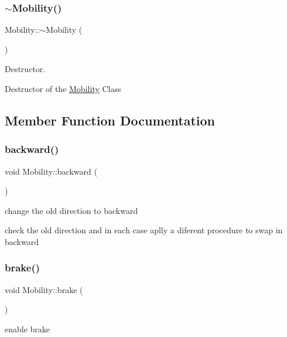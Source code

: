 \subsubsection{\texorpdfstring{$\sim$\+Mobility()}{~Mobility()}}
{\footnotesize\ttfamily Mobility\+::$\sim$\+Mobility (\begin{DoxyParamCaption}{ }\end{DoxyParamCaption})}



Destructor. 

Destructor of the \hyperlink{class_mobility}{Mobility} Class\textquotesingle{} 

\subsection{Member Function Documentation}
\mbox{\label{class_mobility_a201de04cf2f094283d20f77f2520a96f}} 
\subsubsection{\texorpdfstring{backward()}{backward()}}
{\footnotesize\ttfamily void Mobility\+::backward (\begin{DoxyParamCaption}{ }\end{DoxyParamCaption})}



change the old direction to backward 

check the old direction and in each case aplly a diferent procedure to swap in backward \mbox{\label{class_mobility_a287c595643b0ac17019ee9b875e96c72}} 
\subsubsection{\texorpdfstring{brake()}{brake()}}
{\footnotesize\ttfamily void Mobility\+::brake (\begin{DoxyParamCaption}{ }\end{DoxyParamCaption})}



enable brake 

\mbox{\label{class_mobility_a9208362074642bb10b5868e7cc75395c}} 
